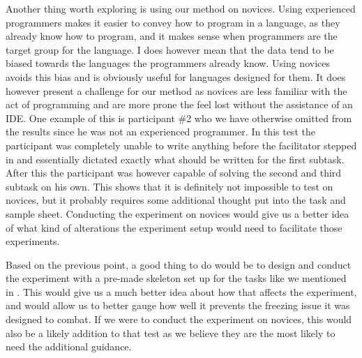 Another thing worth exploring is using our method on novices.
Using experienced programmers makes it easier to convey how to program in a language, as they already know how to program, and it  makes sense when programmers are the target group for the language.
I does however mean that the data tend to be biased towards the languages the programmers already know.
Using novices avoids this bias and is obviously useful for languages designed for them.
It does however present a challenge for our method as novices are less familiar with the act of programming and are more prone the feel lost without the assistance of an IDE.
One example of this is participant \#2 who we have otherwise omitted from the results since he was not an experienced programmer.
In this test the participant was completely unable to write anything before the facilitator stepped in and essentially dictated exactly what should be written for the first subtask.
After this the participant was however capable of solving the second and third subtask on his own.
This shows that it is definitely not impossible to test on novices, but it probably requires some additional thought put into the task and sample sheet.
Conducting the experiment on novices would give us a better idea of what kind of alterations the experiment setup would need to facilitate those experiments.

Based on the previous point, a good thing to do would be to design and conduct the experiment with a pre-made skeleton set up for the tasks like we mentioned in .
This would give us a much better idea about how that affects the experiment, and would allow us to better gauge how well it prevents the freezing issue it was designed to combat.
If we were to conduct the experiment on novices, this would also be a likely addition to that test as we believe they are the most likely to need the additional guidance. 

